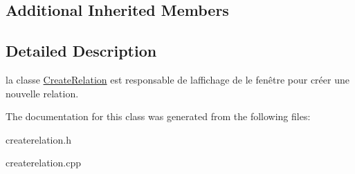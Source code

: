 \subsection*{Additional Inherited Members}


\subsection{Detailed Description}
la classe \hyperlink{classCreateRelation}{Create\+Relation} est responsable de l\textquotesingle{}affichage de le fenêtre pour créer une nouvelle relation. 

The documentation for this class was generated from the following files\+:\begin{DoxyCompactItemize}
\item 
createrelation.\+h\item 
createrelation.\+cpp\end{DoxyCompactItemize}
